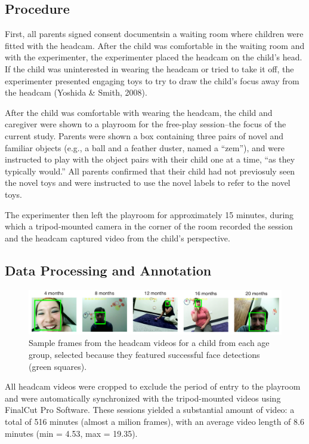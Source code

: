 \documentclass[10pt, letterpaper]{article}
\begin{document}
\subsection{Procedure}\label{procedure}

First, all parents signed consent documentsin a waiting room where
children were fitted with the headcam. After the child was comfortable
in the waiting room and with the experimenter, the experimenter placed
the headcam on the child's head. If the child was uninterested in
wearing the headcam or tried to take it off, the experimenter presented
engaging toys to try to draw the child's focus away from the headcam
(Yoshida \& Smith, 2008).

After the child was comfortable with wearing the headcam, the child and
caregiver were shown to a playroom for the free-play session--the focus
of the current study. Parents were shown a box containing three pairs of
novel and familiar objects (e.g., a ball and a feather duster, named a
``zem''), and were instructed to play with the object pairs with their
child one at a time, ``as they typically would.'' All parents confirmed
that their child had not previosuly seen the novel toys and were
instructed to use the novel labels to refer to the novel toys.

The experimenter then left the playroom for approximately 15 minutes,
during which a tripod-mounted camera in the corner of the room recorded
the session and the headcam captured video from the child's perspective.

\subsection{Data Processing and
Annotation}\label{data-processing-and-annotation}

\begin{figure}
\includegraphics[width=6in]{images/framesample.pdf}
\caption{\label{fig:frames} Sample frames from the headcam videos for a child from each age group, selected because they featured successful face detections (green squares).}
\end{figure}

All headcam videos were cropped to exclude the period of entry to the
playroom and were automatically synchronized with the tripod-mounted
videos using FinalCut Pro Software. These sessions yielded a substantial
amount of video: a total of 516 minutes (almost a milion frames), with
an average video length of 8.6 minutes (min = 4.53, max = 19.35).
\end{document}
